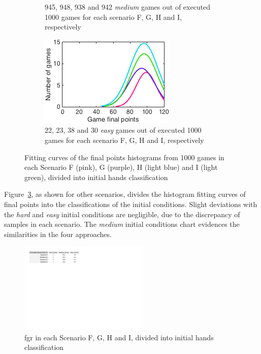 \begin{figure}[h]
\begin{subfigure}[h]{0.32\textwidth}
                \caption{945, 948, 938 and 942 \emph{medium} games out of executed 1000 games for each scenario F, G, H and I, respectively}
                \label{fig:FGHImedium}
        \end{subfigure}
        \begin{subfigure}[h]{0.32\textwidth}
                \includegraphics[width=\textwidth]{./img/4/FGHIeasy}
                \caption{22, 23, 38 and 30 \emph{easy} games out of executed 1000 games for each scenario F, G, H and I, respectively}
                \label{fig:FGHIeasy}
        \end{subfigure}
        \caption{Fitting curves of the final points histograms from 1000 games in each Scenario F (pink), G (purple), H (light blue) and I (light green), divided into initial hands classification}
        \label{fig:FGHI-CH}
\end{figure}

Figure~\ref{fig:FGHI-CH}, as shown for other scenarios, divides the histogram fitting curves of final points into the classifications of the initial conditions.
Slight deviations with the \emph{hard} and \emph{easy} initial conditions are negligible, due to the discrepancy of samples in each scenario.
The \emph{medium} initial conditions chart evidences the similarities in the four approaches.

\begin{figure}[h!]
  \centering
    \includegraphics[width=0.55\textwidth]{./img/4/FGHI-fgr}
  \caption{\ac{fgr} in each Scenario F, G, H and I, divided into initial hands classification}
\label{fig:FGHI-fgr}
\end{figure}

